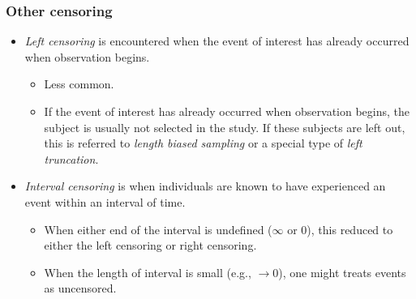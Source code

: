 \documentclass[10pt]{beamer}\usepackage[]{graphicx}\usepackage[]{color}
\newcommand{\empr}[1]{{\emph{\color{red}#1}}}
\begin{document}
\begin{frame}
  \frametitle{Other censoring}
  \begin{itemize}
  \item \empr{Left censoring} is encountered when the event of interest has already occurred when observation begins.
    \begin{itemize}
    \item Less common. 
    \item If the event of interest has already occurred when observation begins, 
      the subject is usually not selected in the study. 
      If these subjects are left out, this is referred to \emph{length biased sampling} or a special type of \emph{left truncation}.
    \end{itemize}
  \item \empr{Interval censoring} is when individuals are known to have experienced an event within an interval of time.
    \begin{itemize}
    \item When either end of the interval is undefined ($\infty$ or 0), 
      this reduced to either the left censoring or right censoring.
    \item When the length of interval is small (e.g., $\to0$), one might treats events as uncensored.
    \end{itemize}    
  \end{itemize}
\end{frame}  
\end{document}

